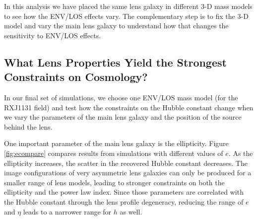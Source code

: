 \documentclass{emulateapj}
\begin{document}
In this analysis we have placed the same lens galaxy in different 3-D mass models to see how the ENV/LOS effects vary.  The complementary step is to fix the 3-D model and vary the main lens galaxy to understand how that changes the sensitivity to ENV/LOS effects.

\subsection{What Lens Properties Yield the Strongest Constraints on Cosmology?}
\label{sec:ImageConfigs}

In our final set of simulations, we choose one ENV/LOS mass model (for the RXJ1131 field) and test how the constraints on the Hubble constant change when we vary the parameters of the main lens galaxy and the position of the source behind the lens.

One important parameter of the main lens galaxy is the ellipticity. Figure \ref{fig:ecompare} compares results from simulations with different values of $e$.  As the ellipticity increases, the scatter in the recovered Hubble constant decreases.
The image configurations of very asymmetric lens galaxies can only be produced for a smaller range of lens models, leading to stronger constraints on both the ellipticity and the power law index.  Since those parameters are correlated with the Hubble constant through the lens profile degeneracy, reducing the range of $e$ and $\eta$ leads to a narrower range for $h$ as well.
\end{document}
